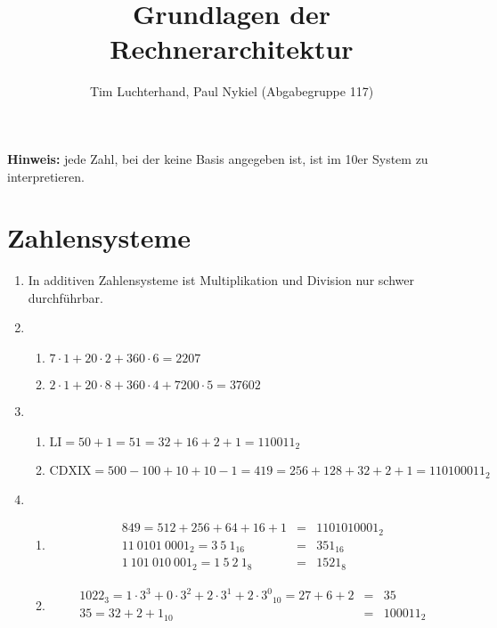 \documentclass[DIN, pagenumber=false, fontsize=11pt, parskip=half]{scrartcl}
\title{Grundlagen der Rechnerarchitektur}
\author{Tim Luchterhand, Paul Nykiel (Abgabegruppe 117)}
\begin{document}
    \maketitle
    \textbf{Hinweis: } jede Zahl, bei der keine Basis angegeben ist, ist im 10er System zu interpretieren.
    \section{Zahlensysteme}
    \begin{enumerate}
        \item In additiven Zahlensysteme ist Multiplikation und Division nur schwer durchführbar.
        \item 
            \begin{enumerate}
                \item $7 \cdot 1 + 20 \cdot 2 + 360 \cdot 6 = 2207$
                \item $2 \cdot 1 + 20 \cdot 8 + 360 \cdot 4 + 7200 \cdot 5 = 37602$
            \end{enumerate}
        \item 
            \begin{enumerate}
                \item $\text{LI} = 50 + 1 = 51 = 32 + 16 + 2 + 1 = {110011}_2$
                \item $\text{CDXIX} = 500 - 100 + 10 + 10 - 1 = 419 = 256 + 128 + 32 + 2 + 1 = {110100011}_2$
            \end{enumerate}
        \item 
            \begin{enumerate}
                \item 
                    \begin{eqnarray*}
                        849 = 512 + 256 + 64 + 16 + 1 &=& {1101010001}_2\\
                        {11\ 0101\ 0001}_2 = {3\ 5\ 1}_{16} &=& {351}_{16}\\
                        {1\ 101\ 010\ 001}_2 = {1\ 5\ 2\ 1}_{8} &=& {1521}_8
                    \end{eqnarray*}
                \item 
                    \begin{eqnarray*}
                        {1022}_{3} = {1 \cdot 3^3 + 0 \cdot 3^2 + 2 \cdot 3^1 + 2 \cdot 3^0}_{10} = 27 + 6 + 2 &=& 35\\
                        35 = {32 + 2 + 1}_{10} &=& {100011}_{2}\\

\end{eqnarray*}
\end{enumerate}
\end{enumerate}
\end{document}
